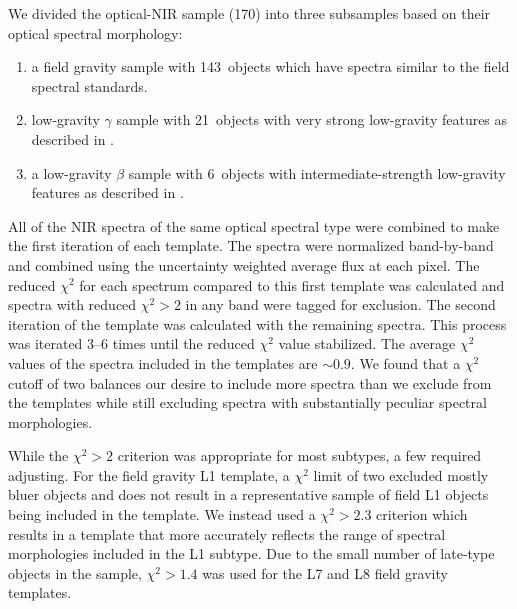 \documentclass[12pt]{aastex6}
\newcommand{\sample}{170}
\newcommand{\optField}{143}
\newcommand{\optBeta}{6}
\newcommand{\optGamma}{21}
\begin{document}
We divided the optical-NIR sample (\sample) into three subsamples based on their optical spectral morphology:
\begin{enumerate} \itemsep1pt \parskip0pt 
	\item a field gravity sample with \optField~objects which have spectra similar to the \citet{K99} field spectral standards.
	\item low-gravity $\gamma$ sample with \optGamma~objects with very strong low-gravity features as described in \citet{Cruz09_lowg}.
	\item a low-gravity $\beta$ sample with \optBeta~objects with intermediate-strength low-gravity features as described in \citet{Cruz09_lowg}.
\end{enumerate}

All of the NIR spectra of the same optical spectral type were combined to make the first iteration of each template.
The spectra were normalized band-by-band and combined using the uncertainty weighted average flux at each pixel.
The reduced $\chi^2$ for each spectrum compared to this first template was calculated and spectra with reduced $\chi^2 > 2$ in any band were tagged for exclusion.
The second iteration of the template was calculated with the remaining spectra.
This process was iterated 3--6 times until the reduced $\chi^2$ value stabilized.
The average $\chi^2$ values of the spectra included in the templates are $\sim0.9$.
We found that a $\chi^2$ cutoff of two balances our desire to include more spectra than we exclude from the templates while still excluding spectra with substantially peculiar spectral morphologies.

While the $\chi^2 > 2$ criterion was appropriate for most subtypes, a few required adjusting.
For the field gravity L1 template, a $\chi^2$ limit of two excluded mostly bluer objects and does not result in a representative sample of field L1 objects being included in the template.
We instead used a $\chi^2 > 2.3$ criterion which results in a template that more accurately reflects the range of spectral morphologies included in the L1 subtype.
Due to the small number of late-type objects in the sample, $\chi^2 > 1.4$ was used for the L7 and L8 field gravity templates.
\end{document}
